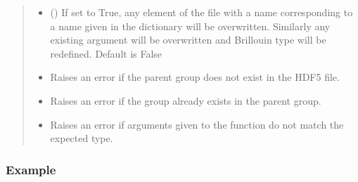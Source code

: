 \documentclass[letterpaper,10pt,english]{sphinxmanual}
\begin{document}
\begin{fulllineitems}
\begin{fulllineitems}
\begin{quote}
\begin{description}
\begin{itemize}
\item {} 
\sphinxAtStartPar
{} (\sphinxstyleliteralemphasis{\sphinxupquote{, }}) \textendash{} If set to True, any element of the file with a name corresponding to a name given in the dictionary will be overwritten. Similarly any existing argument will be overwritten and Brillouin type will be redefined. Default is False

\end{itemize}

\begin{itemize}
\item {} 
\sphinxAtStartPar
{} \textendash{} Raises an error if the parent group does not exist in the HDF5 file.

\item {} 
\sphinxAtStartPar
{} \textendash{} Raises an error if the group already exists in the parent group.

\item {} 
\sphinxAtStartPar
{} \textendash{} Raises an error if arguments given to the function do not match the expected type.

\end{itemize}

\end{description}\end{quote}
\subsubsection*{Example}


\end{fulllineitems}
\end{fulllineitems}
\end{document}
